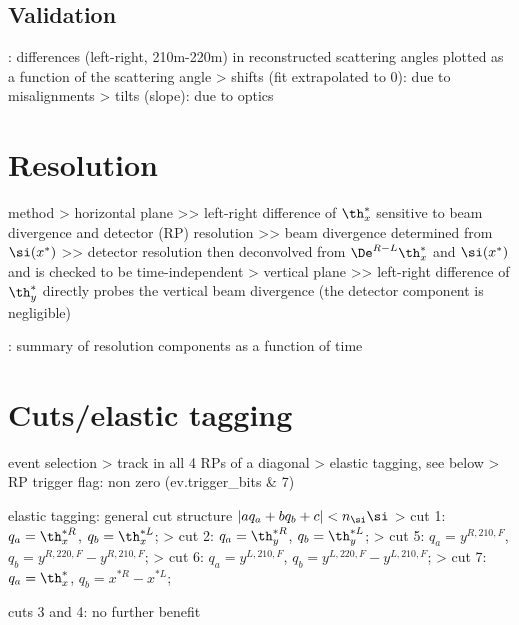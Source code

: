 \subsection{Validation}

\> : differences (left-right, 210m-220m) in reconstructed scattering angles plotted as a function of the scattering angle
\>> shifts (fit extrapolated to 0): due to misalignments
\>> tilts (slope): due to optics



\section{Resolution}

\> method
\>> horizontal plane
\>>> left-right difference of $\th_x^*$ sensitive to beam divergence and detector (RP) resolution
\>>> beam divergence determined from $\si(x^*)$
\>>> detector resolution then deconvolved from $\De^{R-L} \th_x^*$ and $\si(x^*)$ and is checked to be time-independent
\>> vertical plane
\>>> left-right difference of $\th_y^*$ directly probes the vertical beam divergence (the detector component is negligible)

\> : summary of resolution components as a function of time



\section{Cuts/elastic tagging}

\> event selection
\>> track in all 4 RPs of a diagonal
\>> elastic tagging, see below
\>> RP trigger flag: non zero (ev.trigger\_bits \& 7)

\> elastic tagging: general cut structure $| a q_a + b q_b + c| < n_\si  \si$
\>> cut 1: $q_a = \th_x^{*R}$, $q_b = \th_x^{*L}$; 
\>> cut 2: $q_a = \th_y^{*R}$, $q_b = \th_y^{*L}$; 
\>> cut 5: $q_a = y^{R,210,F}$, $q_b = y^{R,220,F} - y^{R,210,F}$; 
\>> cut 6: $q_a = y^{L,210,F}$, $q_b = y^{L,220,F} - y^{L,210,F}$; 
\>> cut 7: $q_a = \th_x^*$, $q_b = x^{*R} - x^{*L}$; 

\> cuts 3 and 4: no further benefit

